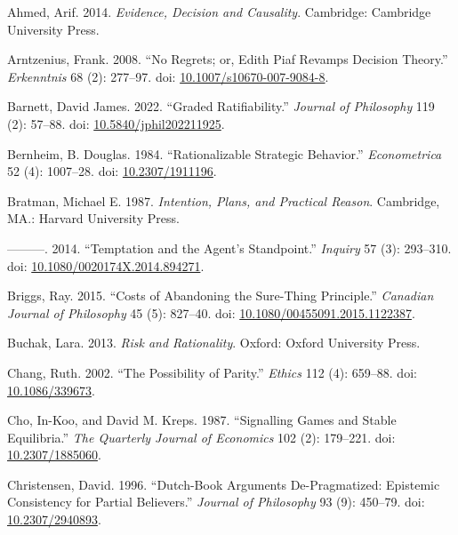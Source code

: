 \documentclass[
  11pt,
  letterpaper,
  DIV=11,
  numbers=noendperiod,
  twoside]{scrartcl}
\newlength{\cslhangindent}
\newenvironment{CSLReferences}[2] %
 {\begin{list}{}{%
  \setlength{\itemindent}{0pt}
  \setlength{\leftmargin}{0pt}
  \setlength{\parsep}{0pt}
  \ifodd #1
   \setlength{\leftmargin}{\cslhangindent}
   \setlength{\itemindent}{-1\cslhangindent}
  \fi
  \setlength{\itemsep}{#2\baselineskip}}}
 {\end{list}}
\begin{document}
\label{refs}
\begin{CSLReferences}{1}{0}
Ahmed, Arif. 2014. \emph{Evidence, Decision and Causality}. Cambridge:
{C}ambridge {U}niversity {P}ress.

Arntzenius, Frank. 2008. {``No Regrets; or, Edith Piaf Revamps Decision
Theory.''} \emph{Erkenntnis} 68 (2): 277--97. doi:
\href{https://doi.org/10.1007/s10670-007-9084-8}{10.1007/s10670-007-9084-8}.

Barnett, David James. 2022. {``Graded Ratifiability.''} \emph{Journal of
Philosophy} 119 (2): 57--88. doi:
\href{https://doi.org/10.5840/jphil202211925}{10.5840/jphil202211925}.

Bernheim, B. Douglas. 1984. {``Rationalizable Strategic Behavior.''}
\emph{Econometrica} 52 (4): 1007--28. doi:
\href{https://doi.org/10.2307/1911196}{10.2307/1911196}.

Bratman, Michael E. 1987. \emph{Intention, Plans, and Practical Reason}.
Cambridge, MA.: Harvard University Press.

---------. 2014. {``Temptation and the Agent's Standpoint.''}
\emph{Inquiry} 57 (3): 293--310. doi:
\href{https://doi.org/10.1080/0020174X.2014.894271}{10.1080/0020174X.2014.894271}.

Briggs, Ray. 2015. {``Costs of Abandoning the Sure-Thing Principle.''}
\emph{Canadian Journal of Philosophy} 45 (5): 827--40. doi:
\href{https://doi.org/10.1080/00455091.2015.1122387}{10.1080/00455091.2015.1122387}.

Buchak, Lara. 2013. \emph{Risk and Rationality}. Oxford: Oxford
University Press.

Chang, Ruth. 2002. {``The Possibility of Parity.''} \emph{Ethics} 112
(4): 659--88. doi:
\href{https://doi.org/10.1086/339673}{10.1086/339673}.

Cho, In-Koo, and David M. Kreps. 1987. {``Signalling Games and Stable
Equilibria.''} \emph{The Quarterly Journal of Economics} 102 (2):
179--221. doi: \href{https://doi.org/10.2307/1885060}{10.2307/1885060}.

Christensen, David. 1996. {``Dutch-Book Arguments {D}e-Pragmatized:
Epistemic Consistency for Partial Believers.''} \emph{Journal of
Philosophy} 93 (9): 450--79. doi:
\href{https://doi.org/10.2307/2940893}{10.2307/2940893}.


\end{CSLReferences}
\end{document}
